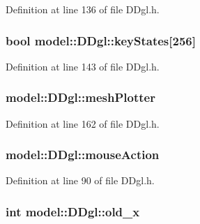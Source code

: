 Definition at line 136 of file D\+Dgl.\+h.

\hypertarget{structmodel_1_1_d_dgl_a2b7fce653241955a75d2c096dd337dea}{}
\subsubsection[{key\+States}]{\setlength{\rightskip}{0pt plus 5cm}bool model\+::\+D\+Dgl\+::key\+States\mbox{[}256\mbox{]}}\label{structmodel_1_1_d_dgl_a2b7fce653241955a75d2c096dd337dea}


Definition at line 143 of file D\+Dgl.\+h.

\hypertarget{structmodel_1_1_d_dgl_aed5871c5477c6ed6b2e99942b55ae9e0}{}
\subsubsection[{mesh\+Plotter}]{ model\+::\+D\+Dgl\+::mesh\+Plotter}\label{structmodel_1_1_d_dgl_aed5871c5477c6ed6b2e99942b55ae9e0}


Definition at line 162 of file D\+Dgl.\+h.

\hypertarget{structmodel_1_1_d_dgl_a1b754a95145c6b728f2122397aa868d9}{}
\subsubsection[{mouse\+Action}]{ model\+::\+D\+Dgl\+::mouse\+Action}\label{structmodel_1_1_d_dgl_a1b754a95145c6b728f2122397aa868d9}


Definition at line 90 of file D\+Dgl.\+h.

\hypertarget{structmodel_1_1_d_dgl_a472ba9264ba52075f77c06cf3a9cc7fa}{}
\subsubsection[{old\+\_\+x}]{\setlength{\rightskip}{0pt plus 5cm}int model\+::\+D\+Dgl\+::old\+\_\+x}\label{structmodel_1_1_d_dgl_a472ba9264ba52075f77c06cf3a9cc7fa}



